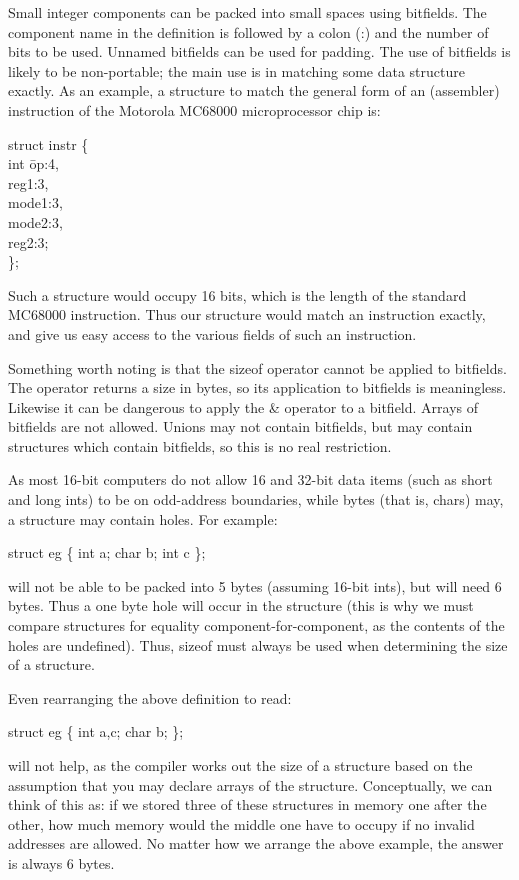      Small integer components can be packed into small spaces using
{\kc bitfields\/}.  The 
component  name in  the definition is followed
by a colon ({\cd :}) and the number of bits  to be  used. Unnamed
bitfields can  be used  for padding. The use of bitfields is  likely
to be non-portable; the main use is in matching some data structure
exactly.  As an example, a structure to match the general form of an
(assembler) instruction of the Motorola MC68000 microprocessor chip is:
\begin{code}
struct instr \{ \+\\
  int \=op:4, \\
  \>  reg1:3, \\
  \>  mode1:3,\\
  \>	mode2:3,\\
  \>	reg2:3;   \-\\
\};
\end{code}
\noindent
     Such a  structure would  occupy 16  bits, which  is  the  length
of  the standard MC68000  instruction. Thus  our structure  would
match an instruction exactly, and give us easy access to the various
fields of such an instruction.

Something worth noting is that the {\cd sizeof} operator cannot be
applied to bitfields. The operator returns a size in bytes, so its
application to bitfields is meaningless. Likewise it can be dangerous
to apply the {\cd \&} operator to a bitfield. Arrays of bitfields are
not allowed. Unions may not contain bitfields, but may contain
structures which contain bitfields, so this is no real restriction.

As most  16-bit computers  do not allow 16 and 32-bit data items
(such as {\cd short} and  {\cd long int}s)  to be  on odd-address
boundaries, while bytes (that is, {\cd char}s) may, a structure may
contain holes. For example:
\begin{code}
struct eg \{ int a; char b; int c \};
\end{code}
\noindent
     will not  be able  to be  packed into 5 bytes (assuming 16-bit
ints), but will need  6 bytes.  Thus a one byte hole will occur in
the structure (this is why we  must compare  structures for  equality
component-for-component, as the contents of  the holes  are
undefined).  Thus, {\cd sizeof}  must always be used when determining the
size of a structure.

     Even rearranging the above definition to read:
\begin{code}
struct eg \{ int a,c; char b; \};
\end{code}
\noindent
     will not help, as the compiler works out the size of a structure
based on the assumption  that you may declare arrays of the
structure. Conceptually, we can think  of this  as: if  we stored
three of these structures in memory one after the  other, how  much
memory  would the  middle one have to occupy if no invalid addresses
are allowed. No matter how we arrange the above example, the answer
is always 6 bytes.

